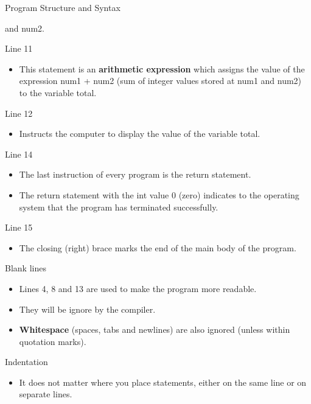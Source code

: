 \documentclass[../lecture1-introduction.tex]{subfiles}
\begin{document}
\begin{frame}[fragile]{Program Structure and Syntax}
{\begin{itemize}
            and num2.
        \end{itemize}
    }
    {
        Line 11
        \begin{itemize}
            \item This statement is an \textbf{arithmetic expression} which assigns
            the value of the expression num1 + num2 (sum of integer values stored
            at num1 and num2) to the variable total.
        \end{itemize}
    }
    {
        Line 12
        \begin{itemize}
            \item Instructs the computer to display the value of the variable total.
        \end{itemize}
    }
    {
        Line 14
        \begin{itemize}
            \item The last instruction of every program is the return statement.
            \item The return statement with the int value 0 (zero) indicates to
            the operating system that the program has terminated successfully.
        \end{itemize}
    }
    {
        Line 15
        \begin{itemize}
            \item The closing (right) brace marks the end of the main body of
            the program.
        \end{itemize}
    }
    {
        Blank lines
        \begin{itemize}
            \item Lines 4, 8 and 13 are used to make the program more readable.
            \item They will be ignore by the compiler.
            \item \textbf{Whitespace} (spaces, tabs and newlines) are also ignored
            (unless within quotation marks).
        \end{itemize}
    }
    {
        Indentation
        \begin{itemize}
            \item It does not matter where you place statements, either on the
            same line or on separate lines.
        \end{itemize}
    }
\end{frame}

\end{document}
